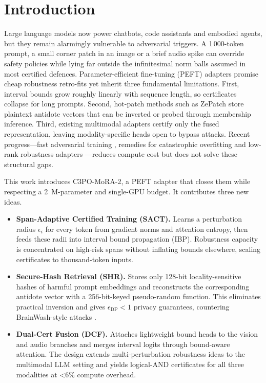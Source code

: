 \documentclass{article}
\begin{document}
\section{Introduction}
Large language models now power chatbots, code assistants and embodied agents, but they remain alarmingly vulnerable to adversarial triggers. A 1\,000-token prompt, a small corner patch in an image or a brief audio spike can override safety policies while lying far outside the infinitesimal norm balls assumed in most certified defences. Parameter-efficient fine-tuning (PEFT) adapters promise cheap robustness retro-fits yet inherit three fundamental limitations. First, interval bounds grow roughly linearly with sequence length, so certificates collapse for long prompts. Second, hot-patch methods such as ZePatch store plaintext antidote vectors that can be inverted or probed through membership inference. Third, existing multimodal adapters certify only the fused representation, leaving modality-specific heads open to bypass attacks. Recent progress—fast adversarial training \cite{wong-2020-fast}, remedies for catastrophic overfitting \cite{andriushchenko-2020-understanding} and low-rank robustness adapters \cite{xu-2023-autolora}—reduces compute cost but does not solve these structural gaps.

This work introduces C3PO-MoRA-2, a PEFT adapter that closes them while respecting a 2~M-parameter and single-GPU budget. It contributes three new ideas.
\begin{itemize}
    \item \textbf{Span-Adaptive Certified Training (SACT).} Learns a perturbation radius $\epsilon_i$ for every token from gradient norms and attention entropy, then feeds these radii into interval bound propagation (IBP). Robustness capacity is concentrated on high-risk spans without inflating bounds elsewhere, scaling certificates to thousand-token inputs.
    \item \textbf{Secure-Hash Retrieval (SHR).} Stores only 128-bit locality-sensitive hashes of harmful prompt embeddings and reconstructs the corresponding antidote vector with a 256-bit-keyed pseudo-random function. This eliminates practical inversion and gives $\epsilon_{\mathrm{DP}}<1$ privacy guarantees, countering BrainWash-style attacks \cite{abbasi-2023-brainwash}.
    \item \textbf{Dual-Cert Fusion (DCF).} Attaches lightweight bound heads to the vision and audio branches and merges interval logits through bound-aware attention. The design extends multi-perturbation robustness ideas \cite{tramr-2019-adversarial} to the multimodal LLM setting and yields logical-AND certificates for all three modalities at <6\% compute overhead.
\end{itemize}
\end{document}
